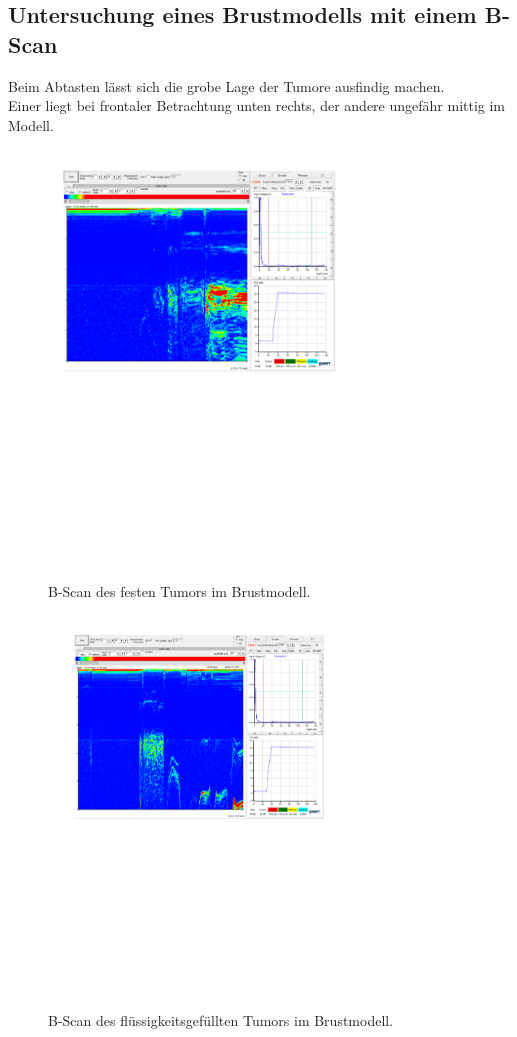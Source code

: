 \subsection{Untersuchung eines Brustmodells mit einem B-Scan}
Beim Abtasten lässt sich die grobe Lage der Tumore ausfindig machen. \\
Einer liegt bei frontaler Betrachtung unten rechts, der andere ungefähr mittig im Modell.

\begin{figure}[H]
  \centering
  \includegraphics[width = 8cm]{content/festtumor.pdf}
  \caption{B-Scan des festen Tumors im Brustmodell.}
  \label{fig:tumorfest}
\end{figure}
\begin{figure}[H]
  \centering
  \includegraphics[width = 8cm]{content/wassertumor.pdf}
  \caption{B-Scan des flüssigkeitsgefüllten Tumors im Brustmodell.}
  \label{fig:tumorfluessig}
\end{figure}

